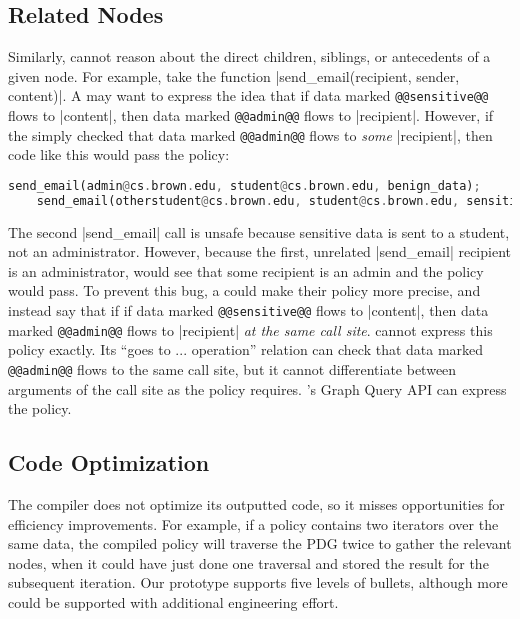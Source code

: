 \subsection{Related Nodes}
Similarly, \syslang{} cannot reason about the direct children, siblings, or antecedents of a given node.
%
For example, take the function |send_email(recipient, sender, content)|.
%
A \ce{} may want to express the idea that if data marked \lstinline[language=CNL]|@@sensitive@@| flows to |content|,
then data marked \lstinline[language=CNL]|@@admin@@| flows to |recipient|.
%
However, if the \ce{} simply checked that data marked \lstinline[language=CNL]|@@admin@@| flows to \emph{some} |recipient|,
then code like this would pass the policy:
\begin{lstlisting}[language=Rust]
    send_email(admin@cs.brown.edu, student@cs.brown.edu, benign_data);
    send_email(otherstudent@cs.brown.edu, student@cs.brown.edu, sensitive_data)
\end{lstlisting}
The second |send_email| call is unsafe because sensitive data is sent to a student, not an administrator.
%
However, because the first, unrelated |send_email| recipient is an administrator, \sys{} would see that some recipient is an admin and the policy would pass.
%
To prevent this bug, a \ce{} could make their policy more precise, and instead say that if if data marked \lstinline[language=CNL]|@@sensitive@@| flows to |content|,
then data marked \lstinline[language=CNL]|@@admin@@| flows to |recipient| \emph{at the same call site}.
%
\syslang{} cannot express this policy exactly.
%
Its ``goes to ... operation'' relation can check that data marked \lstinline[language=CNL]|@@admin@@| flows to the same call site, but it cannot differentiate between arguments of the call site as the policy requires.
%
\sys{}'s Graph Query API can express the policy.

\subsection{Code Optimization}
The \syslang{} compiler does not optimize its outputted code, so it misses opportunities for efficiency improvements.
%
For example, if a policy contains two iterators over the same data, the \syslang{} compiled policy will traverse the PDG twice to gather the relevant nodes,
when it could have just done one traversal and stored the result for the subsequent iteration.
%
Our \syslang{} prototype supports five levels of bullets, although more could be supported with additional engineering effort.
